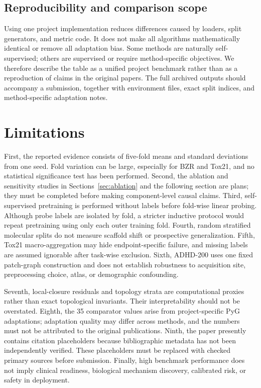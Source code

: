 \documentclass[10pt,twocolumn]{article}
\begin{document}
\subsection{Reproducibility and comparison scope}

Using one project implementation reduces differences caused by loaders, split generators, and metric code. It does not make all algorithms mathematically identical or remove all adaptation bias. Some methods are naturally self-supervised; others are supervised or require method-specific objectives. We therefore describe the table as a unified project benchmark rather than as a reproduction of claims in the original papers. The full archived outputs should accompany a submission, together with environment files, exact split indices, and method-specific adaptation notes.

\section{Limitations}
\label{sec:limitations}

First, the reported evidence consists of five-fold means and standard deviations from one seed. Fold variation can be large, especially for BZR and Tox21, and no statistical significance test has been performed. Second, the ablation and sensitivity studies in Sections~\ref{sec:ablation} and the following section are plans; they must be completed before making component-level causal claims. Third, self-supervised pretraining is performed without labels before fold-wise linear probing. Although probe labels are isolated by fold, a stricter inductive protocol would repeat pretraining using only each outer training fold. Fourth, random stratified molecular splits do not measure scaffold shift or prospective generalization. Fifth, Tox21 macro-aggregation may hide endpoint-specific failure, and missing labels are assumed ignorable after task-wise exclusion. Sixth, ADHD-200 uses one fixed patch-graph construction and does not establish robustness to acquisition site, preprocessing choice, atlas, or demographic confounding.

Seventh, local-closure residuals and topology strata are computational proxies rather than exact topological invariants. Their interpretability should not be overstated. Eighth, the 35 comparator values arise from project-specific PyG adaptations; adaptation quality may differ across methods, and the numbers must not be attributed to the original publications. Ninth, the paper presently contains citation placeholders because bibliographic metadata has not been independently verified. These placeholders must be replaced with checked primary sources before submission. Finally, high benchmark performance does not imply clinical readiness, biological mechanism discovery, calibrated risk, or safety in deployment.
\end{document}
